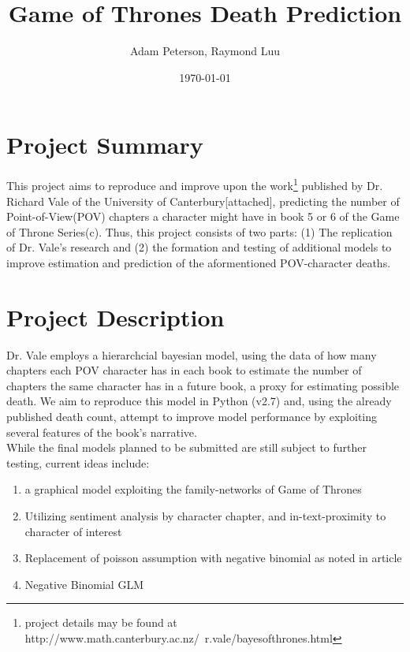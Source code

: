 \documentclass[dvips,10pt]{article}
\begin{document}

\title{Game of Thrones Death Prediction}
\author{Adam Peterson, Raymond Luu}
\date{\today}



\maketitle


\section{Project Summary}


This project aims to reproduce and improve upon the work\footnote{project details may be found at http://www.math.canterbury.ac.nz/~r.vale/bayesofthrones.html} published by Dr. Richard Vale of the University of Canterbury[attached], predicting the number of Point-of-View(POV) chapters a character might have in book 5 or 6 of the Game of Throne Series(c). Thus, this project consists of two parts: (1) The replication of Dr. Vale's research and (2) the formation and testing of additional models to improve estimation and prediction of the aformentioned POV-character deaths.


\section{Project Description}


Dr. Vale employs a hierarchcial bayesian model, using the data of how many chapters each POV character has in each book to estimate the number of chapters the same character has in a future book, a proxy for estimating possible death. We aim to reproduce this model in Python (v2.7) and, using the already published death count, attempt to improve model performance by exploiting several features of the book's narrative.\\
While the final models planned to be submitted are still subject to further testing, current ideas include: 
\begin{enumerate}
	\item a graphical model exploiting the family-networks of Game of Thrones
	\item Utilizing sentiment analysis by character chapter, and in-text-proximity to character of interest
	\item Replacement of poisson assumption with negative binomial as noted in article
	\item Negative Binomial GLM
\end{enumerate}
\end{document}

